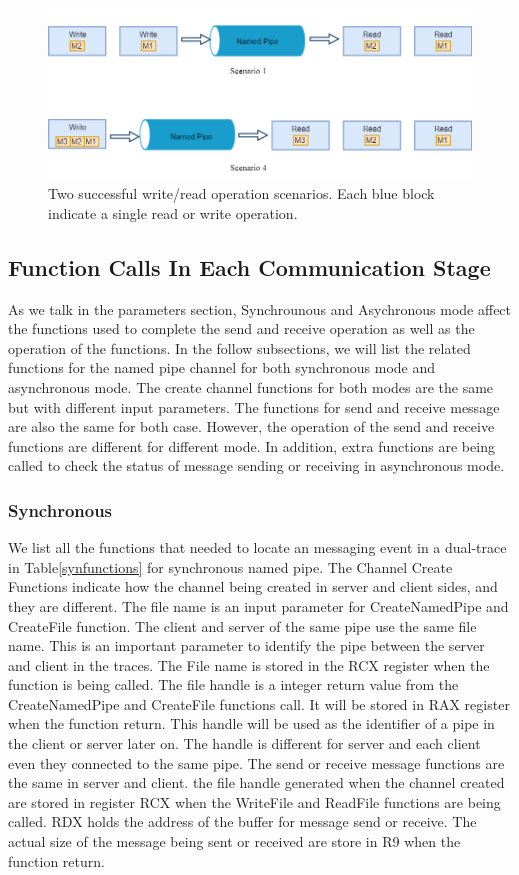 \begin{figure}[h]
\includegraphics[scale=.48]{Figures/event}
 \caption{Two successful write/read operation scenarios. Each blue block indicate a single read or write operation.}
\label{event}
\end{figure}


\subsection{Function Calls In Each Communication Stage}
As we talk in the parameters section, Synchrounous and Asychronous mode affect the functions used to complete the send and receive operation as well as the operation of the functions. In the follow subsections, we will list the related functions for the named pipe channel for both synchronous mode and asynchronous mode. The create channel functions for both modes are the same but with different input parameters. The functions for send and receive message are also the same for both case. However, the operation of the send and receive functions are different for different mode. In addition, extra functions are being called to check the status of message sending or receiving in asynchronous mode.
\subsubsection{Synchronous}
We list all the functions that needed to locate an messaging event in a dual-trace in Table\ref{synfunctions} for synchronous named pipe. The Channel Create Functions indicate how the channel being created in server and client sides, and they are different. The file name is an input parameter for CreateNamedPipe and CreateFile function. The client and server of the same pipe use the same file name. This is an important parameter to identify the pipe between the server and client in the traces. The File name is stored in the RCX register when the function is being called. The file handle is a integer return value from the CreateNamedPipe and CreateFile functions call. It will be stored in RAX register when the function return. This handle will be used as the identifier of a pipe in the client or server later on. The handle is different for server and each client even they connected to the same pipe. The send or receive message functions are the same in server and client. the file handle generated when the channel created are stored in register RCX when the WriteFile and ReadFile functions are being called. RDX holds the address of the buffer for message send or receive. The actual size of the message being sent or received are store in R9 when the function return.
  
